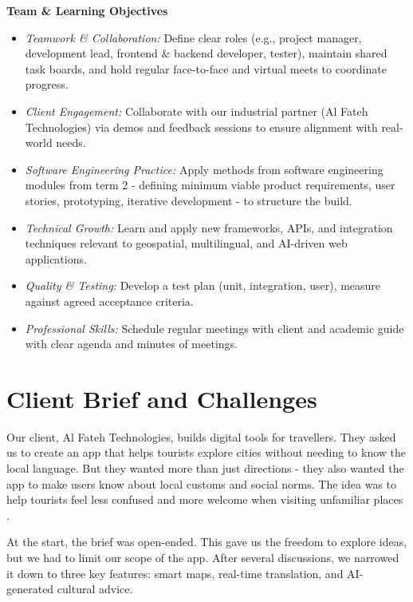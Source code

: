 \textbf{Team \& Learning Objectives}
\begin{itemize}
  \item \textit{Teamwork \& Collaboration:} Define clear roles (e.g., project manager, development lead, frontend \& backend developer, tester), maintain shared task boards, and hold regular face-to-face and virtual meets to coordinate progress.
  \item \textit{Client Engagement:} Collaborate with our industrial partner (Al Fateh Technologies) via demos and feedback sessions to ensure alignment with real-world needs.
  \item \textit{Software Engineering Practice:} Apply methods from software engineering modules from term 2 - defining minimum viable product requirements, user stories, prototyping, iterative development - to structure the build.
  \item \textit{Technical Growth:} Learn and apply new frameworks, APIs, and integration techniques relevant to geospatial, multilingual, and AI-driven web applications.
  \item \textit{Quality \& Testing:} Develop a test plan (unit, integration, user), measure against agreed acceptance criteria.
  \item \textit{Professional Skills:} Schedule regular meetings with client and academic guide with clear agenda and minutes of meetings.
\end{itemize}

\section{Client Brief and Challenges}

Our client, Al Fateh Technologies, builds digital tools for travellers. They asked us to create an app that helps tourists explore cities without needing to know the local language. But they wanted more than just directions - they also wanted the app to make users know about local customs and social norms. The idea was to help tourists feel less confused and more welcome when visiting unfamiliar places \cite{culturegap}.

At the start, the brief was open-ended. This gave us the freedom to explore ideas, but we had to limit our scope of the app. After several discussions, we narrowed it down to three key features: smart maps, real-time translation, and AI-generated cultural advice.

